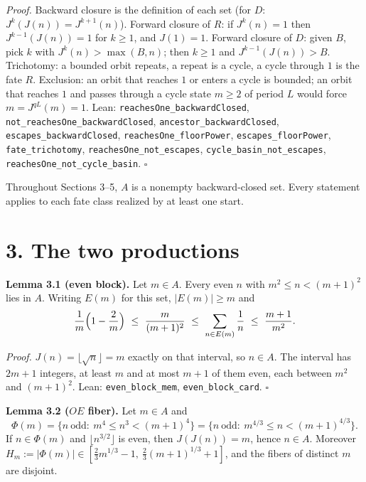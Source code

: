 \documentclass[11pt,a4paper]{article}
\begin{document}
\emph{Proof.} Backward closure is the definition of each set (for \(D\):
\(J^k(J(n))=J^{k+1}(n)\)). Forward closure of \(R\): if \(J^k(n)=1\)
then \(J^{k-1}(J(n))=1\) for \(k\ge 1\), and \(J(1)=1\). Forward closure
of \(D\): given \(B\), pick \(k\) with \(J^k(n)>\max(B,n)\); then
\(k\ge 1\) and \(J^{k-1}(J(n))>B\). Trichotomy: a bounded orbit repeats,
a repeat is a cycle, a cycle through \(1\) is the fate \(R\). Exclusion:
an orbit that reaches \(1\) or enters a cycle is bounded; an orbit that
reaches \(1\) and passes through a cycle state \(m\ge 2\) of period
\(L\) would force \(m=J^{qL}(m)=1\). Lean:
\texttt{\nolinkurl{reachesOne_backwardClosed}},
\texttt{\nolinkurl{not_reachesOne_backwardClosed}},
\texttt{\nolinkurl{ancestor_backwardClosed}},
\texttt{\nolinkurl{escapes_backwardClosed}},
\texttt{\nolinkurl{reachesOne_floorPower}},
\texttt{\nolinkurl{escapes_floorPower}},
\texttt{\nolinkurl{fate_trichotomy}},
\texttt{\nolinkurl{reachesOne_not_escapes}},
\texttt{\nolinkurl{cycle_basin_not_escapes}},
\texttt{\nolinkurl{reachesOne_not_cycle_basin}}. \(\square\)

Throughout Sections 3--5, \(A\) is a nonempty backward-closed set. Every
statement applies to each fate class realized by at least one start.

\section{3. The two productions}\label{the-two-productions}

\textbf{Lemma 3.1 (even block).} Let \(m\in A\). Every even \(n\) with
\(m^2\le n<(m+1)^2\) lies in \(A\). Writing \(E(m)\) for this set,
\(|E(m)|\ge m\) and \[
\frac1m\Bigl(1-\frac2m\Bigr)\ \le\ \frac{m}{(m+1)^2}\ \le\ \sum_{n\in E(m)}\frac1n\ \le\ \frac{m+1}{m^2}.
\]

\emph{Proof.} \(J(n)=\lfloor\sqrt n\rfloor=m\) exactly on that interval,
so \(n\in A\). The interval has \(2m+1\) integers, at least \(m\) and at
most \(m+1\) of them even, each between \(m^2\) and \((m+1)^2\). Lean:
\texttt{\nolinkurl{even_block_mem}},
\texttt{\nolinkurl{even_block_card}}. \(\square\)

\textbf{Lemma 3.2 (\(OE\) fiber).} Let \(m\in A\) and \[
\Phi(m)=\{n\ \text{odd}:\ m^4\le n^3<(m+1)^4\}
=\{n\ \text{odd}:\ m^{4/3}\le n<(m+1)^{4/3}\}.
\] If \(n\in\Phi(m)\) and \(\lfloor n^{3/2}\rfloor\) is even, then
\(J(J(n))=m\), hence \(n\in A\). Moreover
\(H_m:=|\Phi(m)|\in[\tfrac23m^{1/3}-1,\ \tfrac23(m+1)^{1/3}+1]\), and
the fibers of distinct \(m\) are disjoint.
\end{document}
